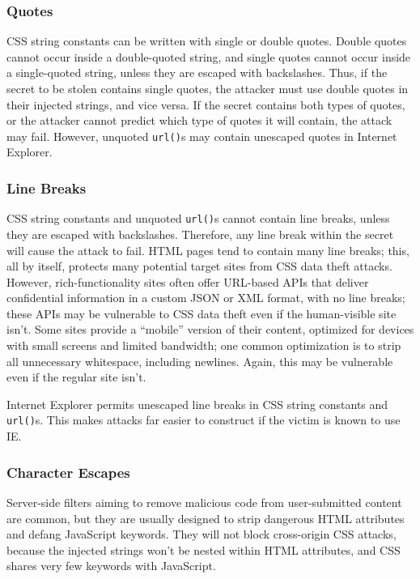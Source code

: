 \documentclass{acm_proc_article-sp}
\begin{document}
\subsubsection{Quotes}
CSS string constants can be written with single or double
quotes. Double quotes cannot occur inside a double-quoted string, and
single quotes cannot occur inside a single-quoted string, unless they
are escaped with backslashes. Thus, if the secret to be stolen
contains single quotes, the attacker must use double quotes in their
injected strings, and vice versa. If the secret contains both types of
quotes, or the attacker cannot predict which type of quotes it will
contain, the attack may fail. However, unquoted \texttt{url()}s may
contain unescaped quotes in Internet Explorer.

\subsubsection{Line Breaks} \label{sec:linebreaks}
CSS string constants and unquoted \texttt{url()}s cannot contain line
breaks, unless they are escaped with backslashes. Therefore, any line
break within the secret will cause the attack to fail. HTML pages tend
to contain many line breaks; this, all by itself, protects many
potential target sites from CSS data theft attacks. However,
rich-functionality sites often offer URL-based APIs that deliver
confidential information in a custom JSON or XML format, with no line
breaks; these APIs may be vulnerable to CSS data theft even if the
human-visible site isn't.  Some sites provide a “mobile” version of
their content, optimized for devices with small screens and limited
bandwidth; one common optimization is to strip all unnecessary
whitespace, including newlines.  Again, this may be vulnerable even if
the regular site isn't.

Internet Explorer permits unescaped line breaks in CSS string
constants and \texttt{url()}s. This makes attacks far easier to
construct if the victim is known to use IE.

\subsubsection{Character Escapes} \label{sec:utf7}
Server-side filters aiming to remove malicious code from
user-submitted content are common, but they are usually designed to
strip dangerous HTML attributes and defang JavaScript keywords.  They
will not block cross-origin CSS attacks, because the injected strings
won't be nested within HTML attributes, and CSS shares very few
keywords with JavaScript.
\end{document}
